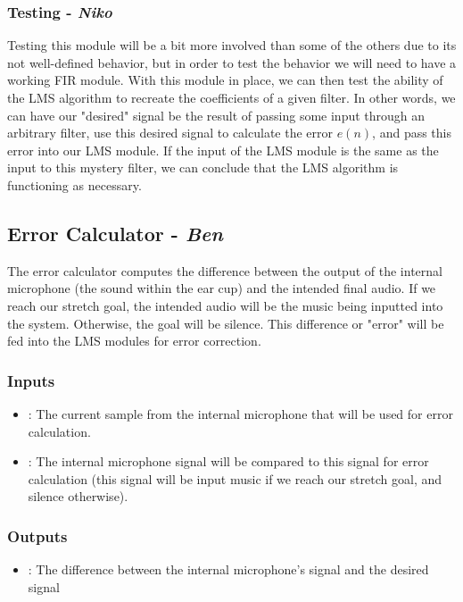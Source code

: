 \documentclass{fpgairpods}
\begin{document}
\begin{multicols*}{2}
\subsubsection{Testing - \textit{Niko}}
Testing this module will be a bit more involved than some of the others due to its not well-defined behavior, but in order to test the behavior we will need to have a working FIR module. With this module in place, we can then test the ability of the LMS algorithm to recreate the coefficients of a given filter. In other words, we can have our "desired" signal be the result of passing some input through an arbitrary filter, use this desired signal to calculate the error $e(n)$, and pass this error into our LMS module. If the input of the LMS module is the same as the input to this mystery filter, we can conclude that the LMS algorithm is functioning as necessary.

\subsection{Error Calculator - \textit{Ben}}
The error calculator computes the difference between the output of the internal microphone (the sound within the ear cup) and the intended final audio. If we reach our stretch goal, the intended audio will be the music being inputted into the system. Otherwise, the goal will be silence. This difference or "error" will be fed into the LMS modules for error correction.
\subsubsection{Inputs}
\begin{itemize}
    \item {}: The current sample from the internal microphone that will be used for error calculation.
    \item {}: The internal microphone signal will be compared to this signal for error calculation (this signal will be input music if we reach our stretch goal, and silence otherwise).
\end{itemize}
\subsubsection{Outputs}
\begin{itemize}
    \item {}: The difference between the internal microphone's signal and the desired signal
\end{itemize}

\end{multicols*}
\end{document}
